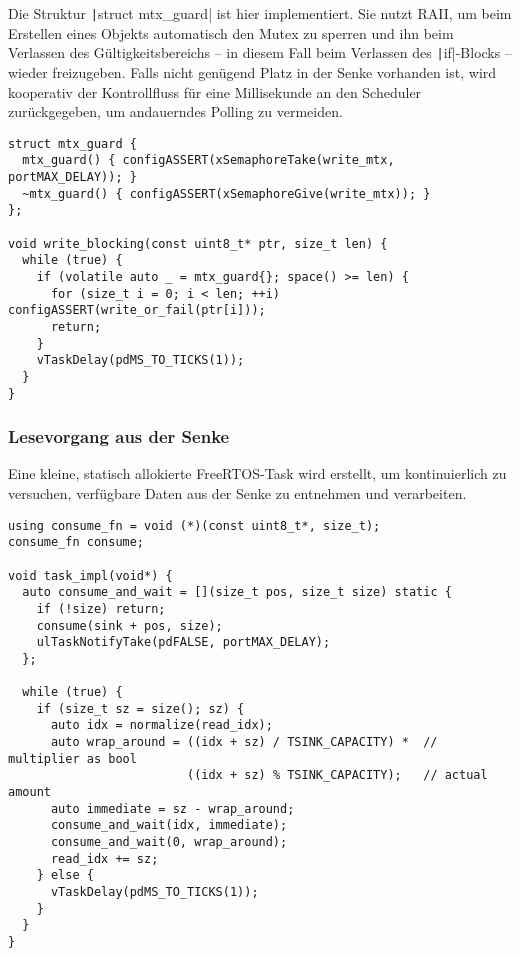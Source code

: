 Die Struktur \texttt|struct mtx_guard| ist hier implementiert. Sie
nutzt \ac{RAII}, um beim Erstellen eines Objekts automatisch den Mutex zu
sperren und ihn beim Verlassen des Gültigkeitsbereichs -- in diesem Fall beim
Verlassen des \texttt|if|-Blocks -- wieder freizugeben. Falls nicht
genügend Platz in der Senke vorhanden ist, wird kooperativ der Kontrollfluss für
eine Millisekunde an den Scheduler zurückgegeben, um andauerndes Polling zu
vermeiden.

\begin{code}
\begin{verbatim}
struct mtx_guard {
  mtx_guard() { configASSERT(xSemaphoreTake(write_mtx, portMAX_DELAY)); }
  ~mtx_guard() { configASSERT(xSemaphoreGive(write_mtx)); }
};

void write_blocking(const uint8_t* ptr, size_t len) {
  while (true) {
    if (volatile auto _ = mtx_guard{}; space() >= len) {
      for (size_t i = 0; i < len; ++i) configASSERT(write_or_fail(ptr[i]));
      return;
    }
    vTaskDelay(pdMS_TO_TICKS(1));
  }
}
\end{verbatim}
\end{code}

\subsubsection{Lesevorgang aus der Senke}

Eine kleine, statisch allokierte FreeRTOS-Task wird erstellt, um kontinuierlich
zu versuchen, verfügbare Daten aus der Senke zu entnehmen und verarbeiten.

\begin{code}
\begin{verbatim}
using consume_fn = void (*)(const uint8_t*, size_t);
consume_fn consume;

void task_impl(void*) {
  auto consume_and_wait = [](size_t pos, size_t size) static {
    if (!size) return;
    consume(sink + pos, size);
    ulTaskNotifyTake(pdFALSE, portMAX_DELAY);
  };

  while (true) {
    if (size_t sz = size(); sz) {
      auto idx = normalize(read_idx);
      auto wrap_around = ((idx + sz) / TSINK_CAPACITY) *  // multiplier as bool
                         ((idx + sz) % TSINK_CAPACITY);   // actual amount
      auto immediate = sz - wrap_around;
      consume_and_wait(idx, immediate);
      consume_and_wait(0, wrap_around);
      read_idx += sz;
    } else {
      vTaskDelay(pdMS_TO_TICKS(1));
    }
  }
}
\end{verbatim}
\end{code}

